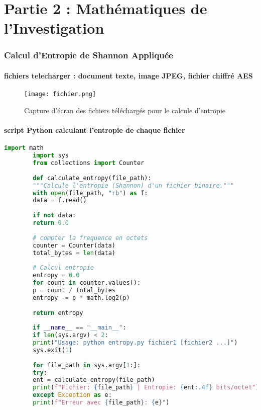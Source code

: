 \documentclass[12pt,a4paper]{article}
\begin{document}
	\part*{\centering Partie 2 : Mathématiques de l'Investigation}
	\section{Calcul d'Entropie de Shannon Appliquée}
	 	\subsection{fichiers telecharger : document texte, image JPEG,
	 		fichier chiffré AES}
	 		\begin{figure}[htbp]
	 			\centering
	 			\texttt{[image: fichier.png]}
	 			\caption{Capture d'écran des fichiers téléchargés pour le calcule d'entropie}
	 			\label{fig:fichiers-telecharges}
	 		\end{figure}
	 	\subsection{script Python calculant l'entropie de chaque fichier}
	 	 
	 \begin{lstlisting}[language=Python, caption=Calcul de l'entropie de Shannon]
	 	import math
	 	import sys
	 	from collections import Counter
	 	
	 	def calculate_entropy(file_path):
	 	"""Calcule l'entropie (Shannon) d'un fichier binaire."""
	 	with open(file_path, "rb") as f:
	 	data = f.read()
	 	
	 	if not data:
	 	return 0.0
	 	
	 	# compter la frequence en octets
	 	counter = Counter(data)
	 	total_bytes = len(data)
	 	
	 	# Calcul entropie
	 	entropy = 0.0
	 	for count in counter.values():
	 	p = count / total_bytes
	 	entropy -= p * math.log2(p)
	 	
	 	return entropy
	 	
	 	if __name__ == "__main__":
	 	if len(sys.argv) < 2:
	 	print("Usage: python entropy.py fichier1 [fichier2 ...]")
	 	sys.exit(1)
	 	
	 	for file_path in sys.argv[1:]:
	 	try:
	 	ent = calculate_entropy(file_path)
	 	print(f"Fichier: {file_path} | Entropie: {ent:.4f} bits/octet")
	 	except Exception as e:
	 	print(f"Erreur avec {file_path}: {e}")
	 \end{lstlisting}
	 
\end{document}
